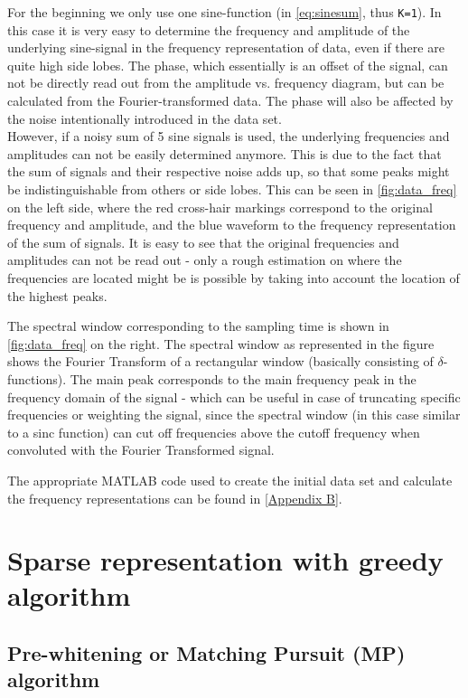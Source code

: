 For the beginning we only use one sine-function (in \cref{eq:sinesum}, thus \texttt{K=1}). In this case it is very easy to determine the frequency and amplitude of the underlying sine-signal in the frequency representation of data, even if there are quite high side lobes. The phase, which essentially is an offset of the signal, can not be directly read out from the amplitude vs. frequency diagram, but can be calculated from the Fourier-transformed data. The phase will also be affected by the noise intentionally introduced in the data set.\\
However, if a noisy sum of 5 sine signals is used, the underlying frequencies and amplitudes can not be easily determined anymore. This is due to the fact that the sum of signals and their respective noise adds up, so that some peaks might be indistinguishable from others or side lobes. This can be seen in \cref{fig:data_freq} on the left side, where the red cross-hair markings correspond to the original frequency and amplitude, and the blue waveform to the frequency representation of the sum of signals. It is easy to see that the original frequencies and amplitudes can not be read out - only a rough estimation on where the frequencies are located might be is possible by taking into account the location of the highest peaks.

The spectral window corresponding to the sampling time is shown in \cref{fig:data_freq} on the right. The spectral window as represented in the figure shows the Fourier Transform of a rectangular window (basically consisting of $\delta$-functions). The main peak corresponds to the main frequency peak in the frequency domain of the signal - which can be useful in case of truncating specific frequencies or weighting the signal, since the spectral window (in this case similar to a sinc function) can cut off frequencies above the cutoff frequency when convoluted with the Fourier Transformed signal.

The appropriate MATLAB code used to create the initial data set and calculate the frequency representations can be found in \cref{Appendix B}.


\section{Sparse representation with greedy algorithm}

\subsection{Pre-whitening or Matching Pursuit (MP) algorithm}




